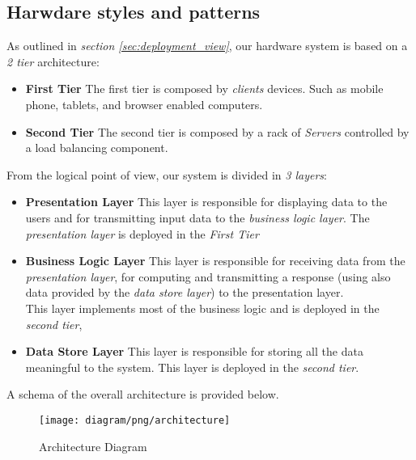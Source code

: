 \subsection{Harwdare styles and patterns} %
\label{sub:harwdare_styles_and_patterns}
As outlined in \emph{section \ref{sec:deployment_view}}, our hardware system is based on a \emph{2 tier} architecture:
\begin{itemize}
	\item \textbf{First Tier} The first tier is composed by \emph{clients} devices. Such as mobile phone, tablets, and browser enabled computers.
	\item \textbf{Second Tier} The second tier is composed by a rack of \emph{Servers} controlled by a load balancing component.
\end{itemize}
From the logical point of view, our system is divided in \emph{3 layers}:
\begin{itemize}
	\item \textbf{Presentation Layer} This layer is responsible for displaying data to the users and for transmitting input data to the \emph{business logic layer}. The \emph{presentation layer} is deployed in the \emph{First Tier}
	\item \textbf{Business Logic Layer} This layer is responsible for receiving data from the \emph{presentation layer}, for computing and transmitting a response (using also data provided by the \emph{data store layer}) to the presentation layer.\\
	This layer implements most of the business logic and is deployed in the \emph{second tier},
	\item \textbf{Data Store Layer} This layer is responsible for storing all the data meaningful to the system. This layer is deployed in the \emph{second tier}.
\end{itemize}
A schema of the overall architecture is provided below.
\begin{figure}[h!t]
\caption{Architecture Diagram}
\texttt{[image: diagram/png/architecture]}
\centering
\end{figure}
\newpage




